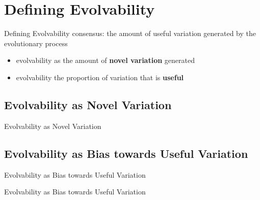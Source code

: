 \section{Defining Evolvability}

\begin{frame}{Defining Evolvability}
consensus: the amount of \textcolor{h2}{useful} \textcolor{h1}{variation} generated by the evolutionary process
\begin{itemize}
  \item evolvability as the amount of \textcolor{h1}{\textbf{novel variation}} generated
  \item evolvability the proportion of variation that is \textcolor{h2}{\textbf{useful}}
\end{itemize}
\end{frame}



\subsection{Evolvability as Novel Variation}

\begin{frame}{Evolvability as Novel Variation}
	
\end{frame}

\subsection{Evolvability as Bias towards Useful Variation}

\begin{frame}{Evolvability as Bias towards Useful Variation}
  
\end{frame}

\begin{frame}{Evolvability as Bias towards Useful Variation}
  
\end{frame}
